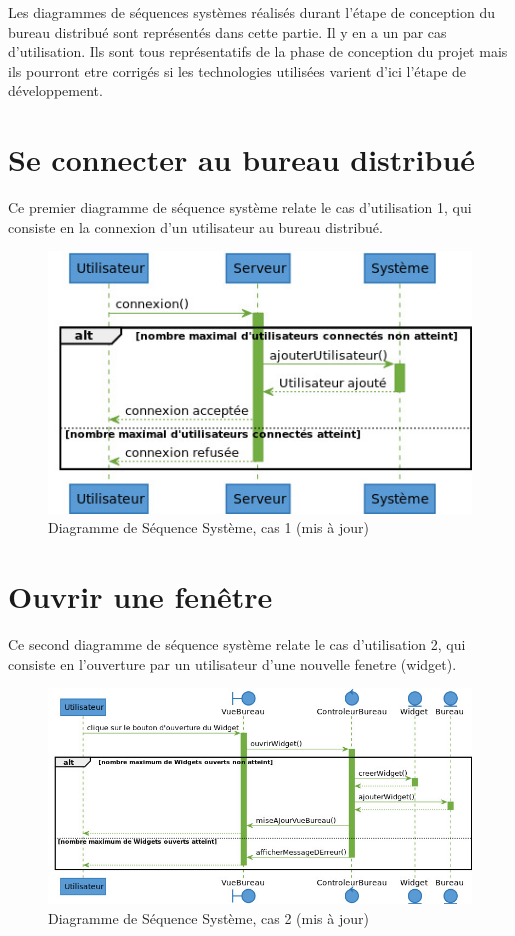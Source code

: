 Les diagrammes de séquences systèmes réalisés durant l'étape
de conception du bureau distribué sont représentés dans cette 
partie. Il y en a un par cas d'utilisation. 
Ils sont tous représentatifs de la phase de conception du projet
mais ils pourront etre corrigés si les technologies utilisées
varient d'ici l'étape de développement.

\section{Se connecter au bureau distribué}

Ce premier diagramme de séquence système relate le cas d'utilisation
1, qui consiste en la connexion d'un utilisateur au bureau distribué.

\begin{figure}[h!]
	\centering
	\includegraphics[scale=0.3]{diagrammes/dss1.jpg}
	\caption{\color{green}Diagramme de Séquence Système, cas 1 (mis à jour)\color{black}}
\end{figure}

\section{Ouvrir une fenêtre}

Ce second diagramme de séquence système relate le cas d'utilisation
2, qui consiste en l'ouverture par un utilisateur d'une nouvelle 
fenetre (widget).

\begin{figure}[h!]
	\centering
	\includegraphics[scale=0.5]{diagrammes/dss2.jpg}
	\caption{\color{green}Diagramme de Séquence Système, cas 2 (mis à jour)\color{black}}
\end{figure}
\newpage
